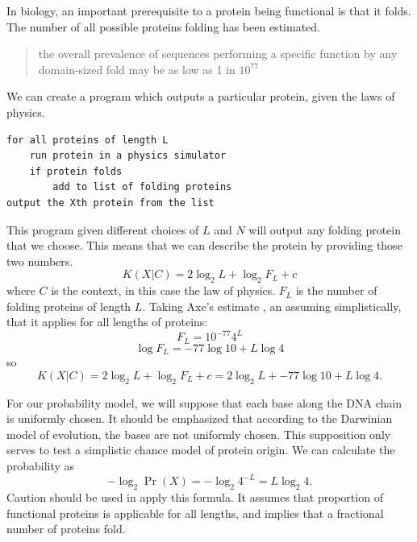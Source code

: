 In biology, an important prerequisite to a protein being functional is that it folds.
The number of all possible proteins folding has been estimated.
\begin{quotation}
    the overall prevalence of sequences performing a specific function by any domain-sized fold may be as low as 1 in $10^{77}$ \cite{axe2004}
\end{quotation}
We can create a program which outputs a particular protein, given the laws of physics.
\begin{verbatim}
for all proteins of length L
    run protein in a physics simulator
    if protein folds
        add to list of folding proteins
output the Xth protein from the list
\end{verbatim}

This program given different choices of $L$ and $N$ will output any folding protein that we choose.
This means that we can describe the protein by providing those two numbers.
\begin{equation}
    K(X|C) = 2 \log_2 L + \log_2 F_L + c
\end{equation} where $C$ is the context, in this case the law of physics.
$F_L$ is the number of folding proteins of length $L$.
Taking Axe's estimate \cite{axe2004}, an assuming simplistically, that it applies for all lengths of proteins:
\begin{equation}
    F_L = 10^{-77} 4^L 
\end{equation}
\begin{equation}
    \log F_L = -77 \log 10 + L \log 4
\end{equation}
so
\begin{equation}
    K(X|C) = 2 \log_2 L + \log_2 F_L + c = 2 \log_2 L + -77 \log 10  + L \log 4 \mbox{.}
\end{equation}

For our probability model, we will suppose that each base along the DNA chain is uniformly chosen.
It should be emphasized that according to the Darwinian model of evolution, the bases are not uniformly chosen.
This supposition only serves to test a simplistic chance model of protein origin.
We can calculate the probability as
\begin{equation}
    -\log_2 \Pr(X) =  -\log_2 4^{-L} = L \log_2 4 \mbox{.}
\end{equation}
Caution should be used in apply this formula.
It assumes that proportion of functional proteins is applicable for all lengths, and implies that a fractional number of proteins fold.

